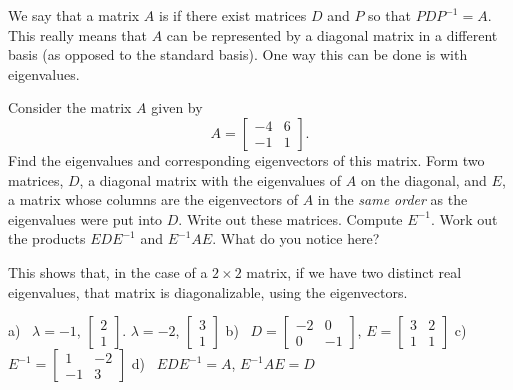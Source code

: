 \begin{exercise} \label{ex:diagonalization}
We say that a matrix $A$ is \emph{} if there exist matrices $D$ and $P$ so that $PDP^{-1} = A$. This really means that $A$ can be represented by a diagonal matrix in a different basis (as opposed to the standard basis). One way this can be done is with eigenvalues.
\begin{tasks}
\task Consider the matrix $A$ given by 
\[ A = \begin{bmatrix} -4 & 6 \\ -1 & 1 \end{bmatrix}. \]
Find the eigenvalues and corresponding eigenvectors of this matrix.
\task Form two matrices, $D$, a diagonal matrix with the eigenvalues of $A$ on the diagonal, and $E$, a matrix whose columns are the eigenvectors of $A$ in the \emph{same order} as the eigenvalues were put into $D$. Write out these matrices.
\task Compute $E^{-1}$. 
\task Work out the products $EDE^{-1}$ and $E^{-1}AE$. What do you notice here?
\end{tasks}
This shows that, in the case of a $2\times 2$ matrix, if we have two distinct real eigenvalues, that matrix is diagonalizable, using the eigenvectors.
\end{exercise}
\comboSol{%
}
{%
a)~ $\lambda =-1$, $\left[\begin{smallmatrix} 2 \\ 1 \end{smallmatrix}\right]$. $\lambda = -2$, $\left[\begin{smallmatrix} 3 \\ 1 \end{smallmatrix}\right]$ \quad b)~ $D = \left[\begin{smallmatrix} -2 & 0 \\ 0 & -1 \end{smallmatrix}\right]$, $E = \left[\begin{smallmatrix} 3 & 2 \\ 1 & 1 \end{smallmatrix}\right]$ \quad
c)~$E^{-1} = \left[\begin{smallmatrix} 1 & -2 \\ -1 & 3 \end{smallmatrix}\right]$ \quad d)~ $EDE^{-1} = A$, $E^{-1}AE = D$
}


